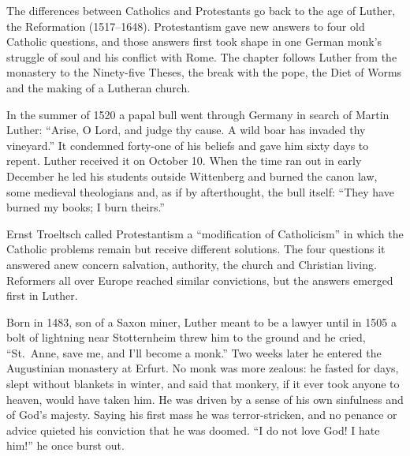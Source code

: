 
\begin{inbrief}
The differences between Catholics and Protestants go back to the age of Luther, the Reformation
(1517--1648). Protestantism gave new answers to four old Catholic questions, and those answers first
took shape in one German monk's struggle of soul and his conflict with Rome. The chapter follows
Luther from the monastery to the Ninety-five Theses, the break with the pope, the Diet of Worms and
the making of a Lutheran church.
\end{inbrief}

In the summer of 1520 a papal bull went through Germany in search of Martin Luther: ``Arise, O Lord,
and judge thy cause. A wild boar has invaded thy vineyard.'' It condemned forty-one of his beliefs and
gave him sixty days to repent. Luther received it on October 10. When the time ran out in early
December he led his students outside Wittenberg and burned the canon law, some medieval theologians
and, as if by afterthought, the bull itself: ``They have burned my books; I burn theirs.''

Ernst Troeltsch called Protestantism a ``modification of Catholicism'' in which the Catholic problems
remain but receive different solutions. The four questions it answered anew concern salvation,
authority, the church and Christian living. Reformers all over Europe reached similar convictions,
but the answers emerged first in Luther.

Born in 1483, son of a Saxon miner, Luther meant to be a lawyer until in 1505 a bolt of lightning
near Stotternheim threw him to the ground and he cried, ``St.~Anne, save me, and I'll become a
monk.'' Two weeks later he entered the Augustinian monastery at Erfurt. No monk was more zealous: he
fasted for days, slept without blankets in winter, and said that monkery, if it ever took anyone to heaven, would have taken him. He was driven by a sense of his own sinfulness and of God's majesty.
Saying his first mass he was terror-stricken, and no penance or advice quieted his conviction that he
was doomed. ``I do not love God! I hate him!'' he once burst out.

